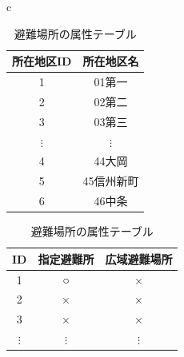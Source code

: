 \documentclass[a4j]{jarticle}
\begin{document}
            \begin{table}[H]
              \begin{center}
                \begin{tabular}{c}

                  \begin{minipage}{0.5\hsize}
            \caption{所在地区テーブル}
            \label{four32}
            \begin{center}
                \begin{tabular}{c|c}\hline
                  所在地区ID & 所在地区名 \\ \hline \hline
                  1 & 01第一 \\ \hline
                  2 & 02第二 \\ \hline 
                  3 & 03第三 \\ \hline
                  $\vdots$ & $\vdots$ \\ \hline
                  4 & 44大岡 \\ \hline
                  5 & 45信州新町 \\ \hline
                  6 & 46中条 \\ \hline                  
                \end{tabular}
            \end{center}
          \end{minipage}

          \begin{minipage}{0.5\hsize}
              \caption{避難場所の属性テーブル}
              \label{four33}
              \begin{center}
                  \begin{tabular}{c|c|c}\hline
                    ID & 指定避難所 & 広域避難場所 \\ \hline \hline
                    1 & ○ & × \\ \hline
                    2 & × & × \\ \hline
                    3 & × & × \\ \hline
                    $\vdots$ & $\vdots$ & $\vdots$ \\ \hline
                  \end{tabular}
              \end{center}
            \end{minipage}
          \end{tabular}
        \end{center}
              \end{table}
\end{document}
